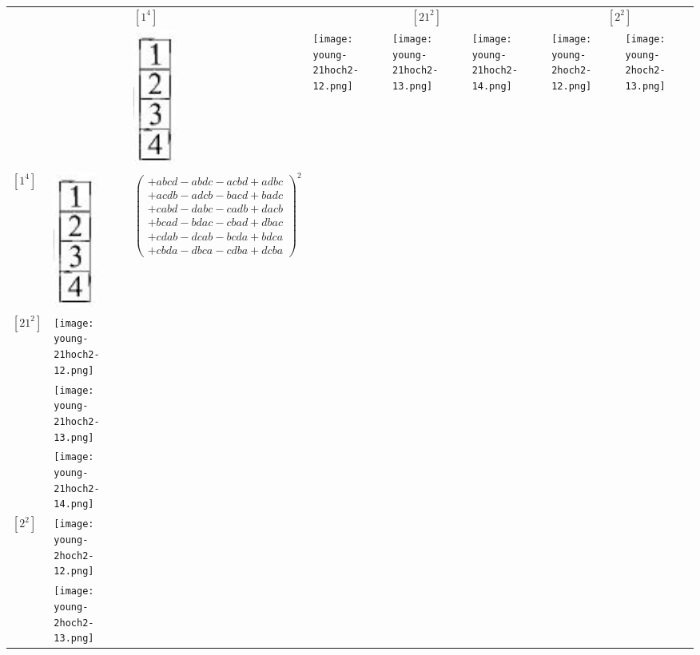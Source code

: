 \documentclass[12pt,a3paper, landscape]{article}
\begin{document}

\begin{tabular}{|p{0.5cm}p{1.5cm}
|p{6cm}|
p{3cm}p{3cm}p{3cm}
|p{2cm}p{2cm}|}
\hline 
& & $\left[ 1 ^4\right]$  & 
\multicolumn{3}{c|}{ $\left[ 21 ^2 \right]$}  & \multicolumn{2}{c|}{$\left[ 2^2\right]$}\\
&& \includegraphics[scale=0.2]{build/young-1hoch4.png} & 
 \texttt{[image: young-21hoch2-12.png]}  &  
 \texttt{[image: young-21hoch2-13.png]} &  
 \texttt{[image: young-21hoch2-14.png]} &  
 \texttt{[image: young-2hoch2-12.png]} & 
 \texttt{[image: young-2hoch2-13.png]}  \\ 
 \hline \rule{0pt}{50pt}
$\left[ 1 ^4\right]$  & 
\includegraphics[scale=0.2]{build/young-1hoch4.png} & 
$\left( \begin{array}{c}
+abcd - abdc - acbd + adbc \\
+ acdb - adcb -bacd + badc \\
+ cabd - dabc - cadb + dacb\\
+bcad - bdac - cbad + dbac \\
+ cdab - dcab -bcda + bdca \\
+ cbda - dbca - cdba + dcba 
\end{array}\right)^2$ &  & & &  & 
 \\ \hline 
\multirow{3}{*}{$\left[ 21 ^2 \right]$}	&  \texttt{[image: young-21hoch2-12.png]}  &  & & &  & & \\ 
 &  \texttt{[image: young-21hoch2-13.png]}  &  &  & & &  & \\
 & \texttt{[image: young-21hoch2-14.png]}  &  &  & & &  &  \\
 \hline
\multirow{2}{*}{$\left[ 2^2\right]$} & \texttt{[image: young-2hoch2-12.png]} & &  & & &  & \\
& \texttt{[image: young-2hoch2-13.png]}  & &  & & &  & \\  
			\hline 
\end{tabular}\\
   
   
   
   
   
   
   
   
   
   
\end{document}
